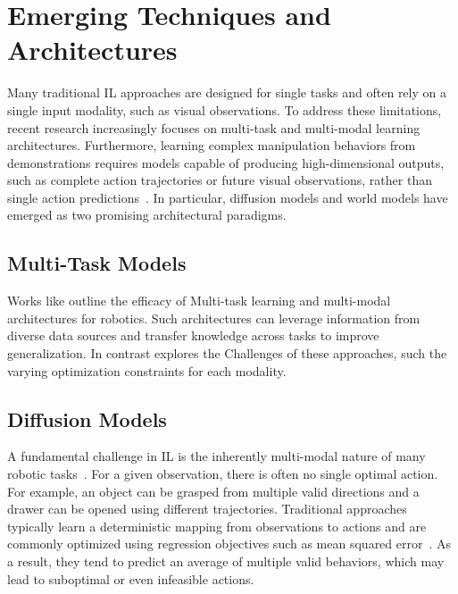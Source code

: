 \section{Emerging Techniques and Architectures}
Many traditional \ac{IL} approaches are designed for single tasks and often rely on a single input modality, such as visual observations. To address these limitations, recent research increasingly focuses on multi-task and multi-modal learning architectures.
Furthermore, learning complex manipulation behaviors from demonstrations requires models capable of producing high-dimensional outputs, such as complete action trajectories or future visual observations, rather than single action predictions~\cite{Wolf2025DiffusionMF, Eze2024LearningBW}. In particular, diffusion models and world models have emerged as two promising architectural paradigms.


\subsection{Multi-Task Models}
Works like \textcite{Mandi2021TowardsMG, ChaneSane2023LearningVP, Huang2021GeneralizationID} outline the efficacy of Multi-task learning and multi-modal architectures for robotics. Such architectures can leverage information from diverse data sources and transfer knowledge across tasks to improve generalization. In contrast \textcite{Yu2020GradientSF} explores the Challenges of these approaches, such the varying optimization constraints for each modality.


\subsection{Diffusion Models}

A fundamental challenge in \ac{IL} is the inherently multi-modal nature of many robotic tasks~\cite{Wolf2025DiffusionMF}. For a given observation, there is often no single optimal action. For example, an object can be grasped from multiple valid directions and a drawer can be opened using different trajectories. Traditional approaches typically learn a deterministic mapping from observations to actions and are commonly optimized using regression objectives such as mean squared error~\cite{Eze2024LearningBW}. As a result, they tend to predict an average of multiple valid behaviors, which may lead to suboptimal or even infeasible actions.


